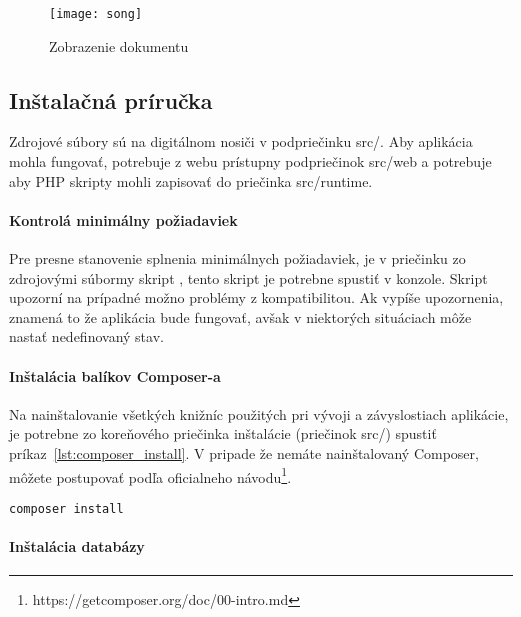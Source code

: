 \begin{figure}
    \begin{center}
        \texttt{[image: song]}
        \caption{Zobrazenie dokumentu}
        \label{fig:song}
    \end{center}
\end{figure}

\newpage

\subsection{Inštalačná príručka}\label{install_guide}

Zdrojové súbory sú na digitálnom nosiči v podpriečinku src/.
Aby aplikácia mohla fungovať, potrebuje z webu prístupny podpriečinok src/web a
potrebuje aby PHP skripty mohli zapisovať do priečinka src/runtime.

\paragraph{Kontrolá minimálny požiadaviek}

Pre presne stanovenie splnenia minimálnych požiadaviek, je v 
priečinku zo zdrojovými súbormy skript , tento skript
je potrebne spustiť v konzole. Skript upozorní na prípadné možno 
problémy z kompatibilitou. Ak vypíše upozornenia, znamená to že aplikácia bude
fungovať, avšak v niektorých situáciach môže nastať nedefinovaný stav.

\paragraph{Inštalácia balíkov Composer-a}

Na nainštalovanie všetkých knižníc použitých pri vývoji a závyslostiach aplikácie,
je potrebne zo koreňového priečinka inštalácie (priečinok src/) spustiť
príkaz \ref{lst:composer_install}. V pripade že nemáte nainštalovaný Composer,
môžete postupovať podľa oficialneho návodu\footnote{https://getcomposer.org/doc/00-intro.md}.

\begin{lstlisting}[label=composer_install, caption=Inštalácia balíkov Composer-a]
composer install
\end{lstlisting}

\paragraph{Inštalácia databázy}

